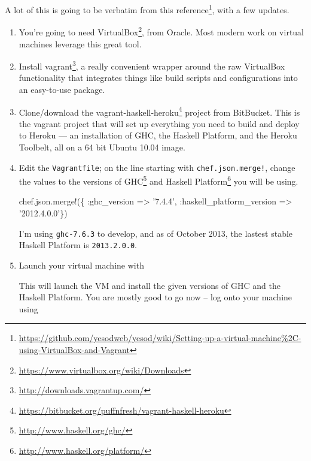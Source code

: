 \documentclass[]{article}
\newenvironment{Shaded}{}{}
\newcommand{\ExtensionTok}[1]{#1}
\newcommand{\NormalTok}[1]{#1}
\newcommand{\StringTok}[1]{\textcolor[rgb]{0.25,0.44,0.63}{#1}}
\renewcommand{\href}[2]{#2\footnote{\url{#1}}}
\begin{document}
A lot of this is going to be verbatim from
\href{https://github.com/yesodweb/yesod/wiki/Setting-up-a-virtual-machine\%2C-using-VirtualBox-and-Vagrant}{this
reference}, with a few updates.

\begin{enumerate}
\def\labelenumi{\arabic{enumi}.}
\item
  You're going to need
  \href{https://www.virtualbox.org/wiki/Downloads}{VirtualBox}, from Oracle.
  Most modern work on virtual machines leverage this great tool.
\item
  Install \href{http://downloads.vagrantup.com/}{vagrant}, a really convenient
  wrapper around the raw VirtualBox functionality that integrates things like
  build scripts and configurations into an easy-to-use package.
\item
  Clone/download the
  \href{https://bitbucket.org/puffnfresh/vagrant-haskell-heroku}{vagrant-haskell-heroku}
  project from BitBucket. This is the vagrant project that will set up
  everything you need to build and deploy to Heroku --- an installation of GHC,
  the Haskell Platform, and the Heroku Toolbelt, all on a 64 bit Ubuntu 10.04
  image.
\item
  Edit the \texttt{Vagrantfile}; on the line starting with
  \texttt{chef.json.merge!}, change the values to the versions of
  \href{http://www.haskell.org/ghc/}{GHC} and
  \href{http://www.haskell.org/platform/}{Haskell Platform} you will be using.

\begin{Shaded}
\begin{Highlighting}[]
\NormalTok{chef.json.merge!(\{ }\StringTok{:ghc_version}\NormalTok{ => }\StringTok{'7.4.4'}\NormalTok{,}
                   \StringTok{:haskell_platform_version}\NormalTok{ => }\StringTok{'2012.4.0.0'}\NormalTok{\})}
\end{Highlighting}
\end{Shaded}

  I'm using \texttt{ghc-7.6.3} to develop, and as of October 2013, the lastest
  stable Haskell Platform is \texttt{2013.2.0.0}.
\item
  Launch your virtual machine with

\begin{Shaded}
\end{Shaded}

  This will launch the VM and install the given versions of GHC and the Haskell
  Platform. You are mostly good to go now -- log onto your machine using


\end{enumerate}
\end{document}
